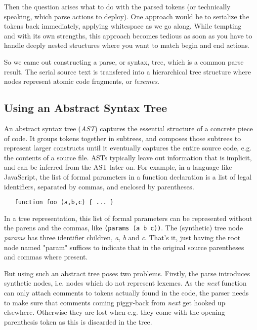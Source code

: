 \documentclass[11pt,a4paper]{article}
\begin{document}
Then the question arises what to do with the parsed tokens (or technically
speaking, which parse actions to deploy). One approach would be to serialize the
tokens back immediately, applying whitespace as we go along. While tempting and
with its own strengths, this approach becomes tedious as soon as you have to handle
deeply nested structures where you want to match begin and end actions.

So we came out constructing a parse, or syntax, tree, which is a common parse
result. The serial source text is transfered into a hierarchical tree structure
where nodes represent atomic code fragments, or \emph{lexemes}.


\subsection{Using an Abstract Syntax Tree}

An abstract syntax tree (\emph{AST}) captures the essential structure of a
concrete piece of code. It groups tokens together in subtrees, and composes
those subtrees to represent larger constructs until it eventually captures the
entire source code, e.g. the contents of a source file. ASTs typically leave out
information that is implicit, and can be inferred from the AST later on. For
example, in a language like JavaScript, the list of formal parameters in a
function declaration is a list of legal identifiers, separated by commas, and
enclosed by parentheses.

\begin{verbatim}
   function foo (a,b,c) { ... }
\end{verbatim}

In a tree representation, this list of formal parameters can be represented
without the parens and the commas, like \texttt{(params (a b c))}. The
(synthetic) tree node \emph{params} has three identifier children, \emph{a},
\emph{b} and \emph{c}. That's it, just having the root node named "param"
suffices to indicate that in the original source parentheses and commas where
present.

But using such an abstract tree poses two problems. Firstly, the parse
introduces synthetic nodes, i.e. nodes which do not represent lexemes. As the
\emph{next} function can only attach comments to tokens actually found in the
code, the parser needs to make sure that comments coming piggy-back from
\emph{next} get hooked up elsewhere. Otherwise they are lost when e.g. they come
with the opening parenthesis token as this is discarded in the tree.
\end{document}
